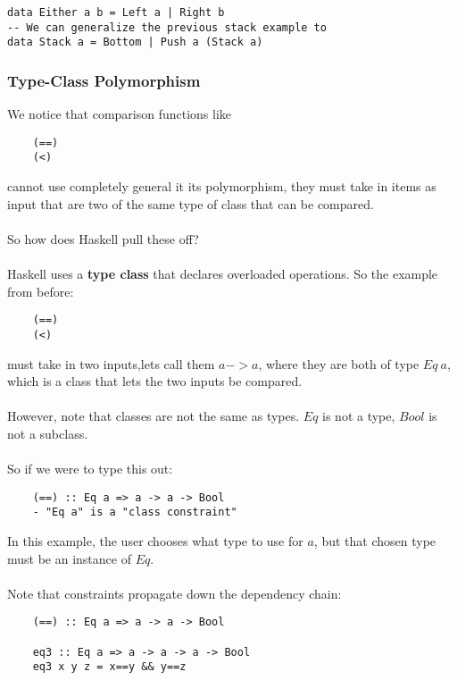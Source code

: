 \documentclass[12pt]{article}
\begin{document}
\begin{lstlisting}
data Either a b = Left a | Right b
-- We can generalize the previous stack example to
data Stack a = Bottom | Push a (Stack a)
\end{lstlisting}

\subsubsection{Type-Class Polymorphism}

We notice that comparison functions like
\begin{lstlisting}
	(==)
	(<)
\end{lstlisting}
cannot use completely general it its polymorphism, they must take in items as input that are two of the same type of class that can be compared.\\
\\
So how does Haskell pull these off?\\
\\
Haskell uses a \textbf{type class} that declares overloaded operations. So the example from before:
\begin{lstlisting}
	(==)
	(<)
\end{lstlisting}
must take in two inputs,lets call them $a->a$, where they are both of type $Eq\: a$, which is a class that lets the two inputs be compared.\\
\\
However, note that classes are not the same as types. $Eq$ is not a type, $Bool$ is not a subclass.\\
\\
So if we were to type this out:
\begin{lstlisting}
	(==) :: Eq a => a -> a -> Bool
	- "Eq a" is a "class constraint"
\end{lstlisting}
In this example, the user chooses what type to use for $a$, but that chosen type must be an instance of $Eq$.\\
\\
Note that constraints propagate down the dependency chain:
\begin{lstlisting}
	(==) :: Eq a => a -> a -> Bool
	
	eq3 :: Eq a => a -> a -> a -> Bool
	eq3 x y z = x==y && y==z
\end{lstlisting}
\end{document}

